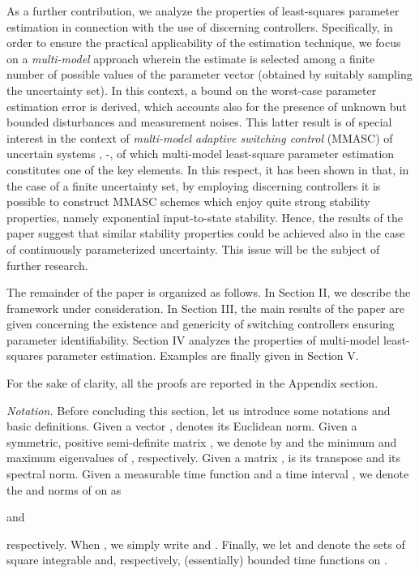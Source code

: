 \documentclass[letterpaper, 10 pt, conference]{ieeetran}
\begin{document}
As a further contribution, we analyze the properties of 
least-squares parameter estimation in connection with the use of discerning controllers.
Specifically, in order to ensure the practical applicability of the estimation technique, we focus on a {\em multi-model} approach wherein the estimate is selected among 
a finite number of possible values of the parameter vector (obtained by suitably sampling the uncertainty set).
In this context, a bound on the worst-case parameter estimation error is derived, which accounts also for the presence of unknown but bounded disturbances 
and measurement noises. This latter result is of special interest in the context of {\em multi-model adaptive switching control} (MMASC) 
of uncertain systems \cite{Ba13}, \cite{morse97}-\nocite{hespanha,debruye,bald}\cite{BaBaTe13}, of which multi-model least-square parameter estimation constitutes one of the key elements. In this respect, it has been shown in  \cite{Ba13,BaBaTe13} that, in the case of a finite uncertainty set, by employing discerning
controllers it is possible to construct MMASC schemes which enjoy quite 
strong stability properties, namely exponential input-to-state stability. Hence, the results of the paper suggest that similar stability properties could be achieved also in the
case of continuously parameterized uncertainty. This issue will be the subject of further research.

The remainder of the paper is organized as follows. In Section II, we describe the framework under 
consideration. In Section III,  the main results of the paper are given concerning the existence and genericity of switching controllers ensuring parameter identifiability.
Section IV analyzes the properties of multi-model least-squares parameter estimation. 
Examples
are finally given in Section V. 

For the sake of clarity, all the proofs are reported in the Appendix section.

\emph{Notation.} Before concluding this section, let us introduce some notations
and basic definitions. Given a vector ,  denotes its Euclidean norm.
Given a symmetric, positive semi-definite matrix , we denote by
 and  the minimum
and maximum eigenvalues of , respectively. Given a matrix ,  is its transpose and  its spectral
norm. Given a measurable time function  and a time interval ,
we denote the  and  norms of  on  as

and

respectively. When , we simply write  and . 
Finally, we let  and  denote the sets of square integrable and, respectively, (essentially) bounded time functions on .
\end{document}
